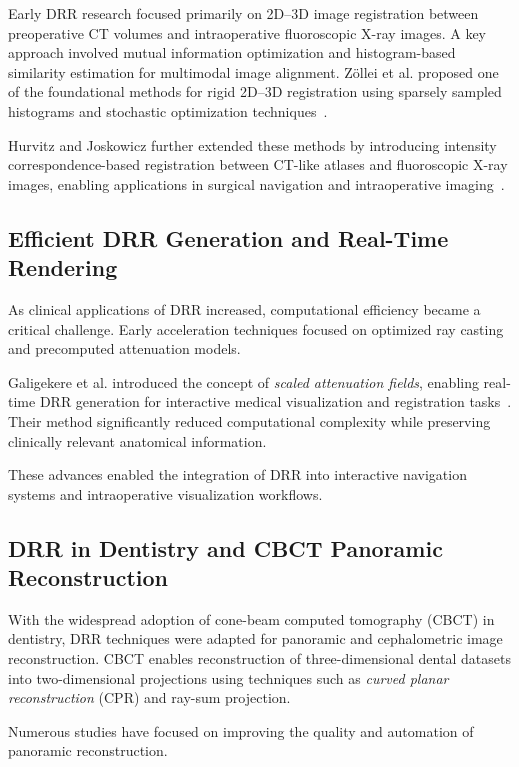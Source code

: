 \documentclass[11pt,a4paper]{article}
\begin{document}
Early DRR research focused primarily on 2D--3D image registration between preoperative CT volumes and intraoperative fluoroscopic X-ray images. A key approach involved mutual information optimization and histogram-based similarity estimation for multimodal image alignment. Zöllei et al. proposed one of the foundational methods for rigid 2D--3D registration using sparsely sampled histograms and stochastic optimization techniques~\cite{Zollei2001MICCAI}.

Hurvitz and Joskowicz further extended these methods by introducing intensity correspondence-based registration between CT-like atlases and fluoroscopic X-ray images, enabling applications in surgical navigation and intraoperative imaging~\cite{Hurvitz2008}.

\subsection{Efficient DRR Generation and Real-Time Rendering}

As clinical applications of DRR increased, computational efficiency became a critical challenge. Early acceleration techniques focused on optimized ray casting and precomputed attenuation models.

Galigekere et al. introduced the concept of \textit{scaled attenuation fields}, enabling real-time DRR generation for interactive medical visualization and registration tasks~\cite{Galigekere2003}. Their method significantly reduced computational complexity while preserving clinically relevant anatomical information.

These advances enabled the integration of DRR into interactive navigation systems and intraoperative visualization workflows.

\subsection{DRR in Dentistry and CBCT Panoramic Reconstruction}

With the widespread adoption of cone-beam computed tomography (CBCT) in dentistry, DRR techniques were adapted for panoramic and cephalometric image reconstruction. CBCT enables reconstruction of three-dimensional dental datasets into two-dimensional projections using techniques such as \textit{curved planar reconstruction} (CPR) and ray-sum projection.

Numerous studies have focused on improving the quality and automation of panoramic reconstruction.
\end{document}
